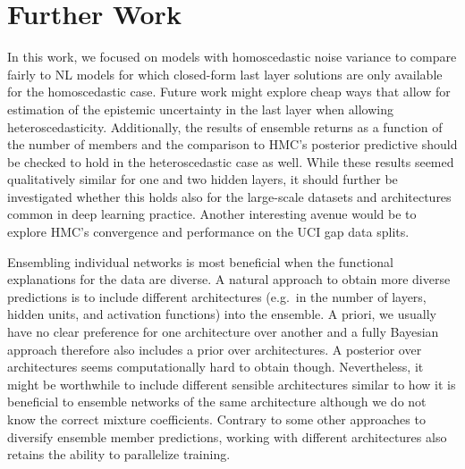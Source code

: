 \documentclass[../thesis.tex]{subfiles}
\begin{document}
\section{Further Work}
In this work, we focused on models with homoscedastic noise variance to compare fairly to NL models for which closed-form last layer solutions are only available for the homoscedastic case. Future work might explore cheap ways that allow for estimation of the epistemic uncertainty in the last layer when allowing heteroscedasticity. Additionally, the results of ensemble returns as a function of the number of members and the comparison to HMC's posterior predictive should be checked to hold in the heteroscedastic case as well. While these results seemed qualitatively similar for one and two hidden layers, it should further be investigated whether this holds also for the large-scale datasets and architectures common in deep learning practice.
Another interesting avenue would be to explore HMC's convergence and performance on the UCI gap data splits.

Ensembling individual networks is most beneficial when the functional explanations for the data are diverse. A natural approach to obtain more diverse predictions is to include different architectures (e.g.\ in the number of layers, hidden units, and activation functions) into the ensemble. A priori, we usually have no clear preference for one architecture over another and a fully Bayesian approach therefore also includes a prior over architectures. A posterior over architectures seems computationally hard to obtain though. Nevertheless, it might be worthwhile to include different sensible architectures similar to how it is beneficial to ensemble networks of the same architecture although we do not know the correct mixture coefficients. Contrary to some other approaches to diversify ensemble member predictions, working with different architectures also retains the ability to parallelize training.
\end{document}
